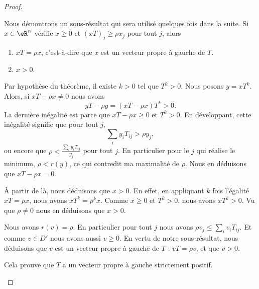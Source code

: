 \begin{proof}
\begin{subproof}
		      \label{SPITEMooBKGPooQDQWdK}
		Nous démontrons un sous-résultat qui sera utilisé quelques fois dans la suite. Si \( x\in \eR^n\) vérifie \( x\geq 0\) et \( (xT)_j\geq \rho x_j\) pour tout \( j\), alors
		\begin{enumerate}
			\item
			      \( xT=\rho x\), c'est-à-dire que \( x\) est un vecteur propre à gauche de \( T\).
			\item
			      \( x>0\).
		\end{enumerate}
		Par hypothèse du théorème, il existe \( k>0\) tel que \( T^k>0\). Nous posons \( y=xT^k\). Alors, si \( xT-\rho x\neq 0\) nous avons
		\begin{equation}
			yT-\rho y=(xT-\rho x)T^k>0.
		\end{equation}
		La dernière inégalité est parce que  \( xT-\rho x\geq 0\) et \( T^k>0\). En développant, cette inégalité signifie que pour tout \( j\),
		\begin{equation}
			\sum_iy_iT_{ij}>\rho y_j,
		\end{equation}
		ou encore que $\rho<\frac{ \sum_iy_iT_{ij} }{ y_j }$ pour tout \( j\). En particulier pour le \( j\) qui réalise le minimum, \( \rho<r(y)\), ce qui contredit ma maximalité de \( \rho\). Nous en déduisons que \( xT-\rho x=0\).

		À partir de là, nous déduisons que \( x>0\). En effet, en appliquant \( k\) fois l'égalité \( xT=\rho x\), nous avons \( xT^k=\rho^k x\). Comme \( x\geq 0\) et \( T^k>0\), nous avons \( xT^k>0\). Vu que \( \rho\neq 0\) nous en déduisons que \( x>0\).

		Nous avons \( r(v)=\rho\). En particulier pour tout \( j\) nous avons \( \rho v_j \leq \sum_iv_iT_{ij}\). Et comme \( v\in D'\) nous avons aussi \( v\geq 0\). En vertu de notre sous-résultat, nous déduisons que \( v\) est un vecteur propre à gauche de \( T\) : \( vT=\rho v\), et que \( v>0\).

		Cela prouve que \( T\) a un vecteur propre à gauche strictement positif.


\end{subproof}
\end{proof}
